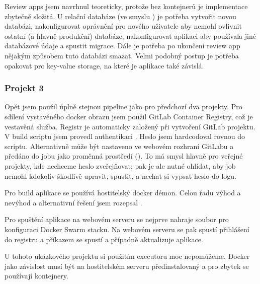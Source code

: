             Review apps jsem navrhnul teoreticky, protože bez kontejnerů je implementace zbytečně složitá. U relační databáze (ve smyslu ) je potřeba vytvořit novou databázi, nakonfigurovat oprávnění pro nového uživatele aby nemohl ovlivnit ostatní (a hlavně produkční) databáze, nakonfigurovat aplikaci aby používala jiné databázové údaje a spustit migrace. Dále je potřeba po ukončení review app nějakým způsobem tuto databázi smazat. Velmi podobný postup je potřeba opakovat pro key-value storage, na které je aplikace také závislá.

        \subsubsection{Projekt 3}
            Opět jsem použil úplně stejnou pipeline jako pro předchozí dva projekty. Pro sdílení vystavěného docker obrazu jsem použil GitLab Container Registry, což je vestavěná služba. Registr je automaticky založený při vytvoření GitLab projektu. V build scriptu jsem provedl authentikaci . Heslo jsem hardcodoval rovnou do scriptu. Alternativně může být nastaveno ve webovém rozhraní GitLabu a předáno do jobu jako proměnná prostředí (). To má smysl hlavně pro veřejné projekty, kde nechceme heslo zveřejňovat; pak je ale nutné ohlídat, aby \CI job nemohl kdokoliv škodlivě upravit, spustit, a nechat si vypsat heslo do logu.

            Pro build aplikace se používá hostitelský docker démon. Celou řadu výhod a nevýhod a alternativní řešení jsem rozepsal .

            Pro spuštění aplikace na webovém serveru se nejprve nahraje soubor pro konfiguraci Docker Swarm stacku. Na webovém serveru se pak spustí přihlášení do registru a příkazem  se spustí a případně aktualizuje aplikace.

            U tohoto ukázkového projektu si použitím  executoru moc nepomůžeme. Docker jako závislost musí být na hostitelském serveru předinstalovaný a pro zbytek se používají kontejnery.
